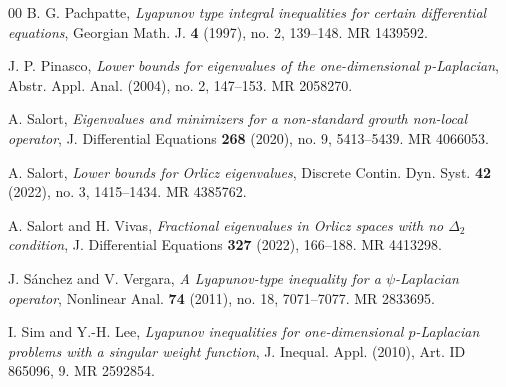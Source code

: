 \documentclass[12pt,reqno]{amsart}
\theoremstyle{definition}
\theoremstyle{remark}
\numberwithin{equation}{section}
\begin{document}
\begin{thebibliography}{00}
B. G. Pachpatte, \emph{Lyapunov type integral inequalities for certain differential equations}, Georgian Math. J. \textbf{4} (1997), no. 2, 139--148. MR 1439592.

J. P. Pinasco, \emph{Lower bounds for eigenvalues of the one-dimensional $p$-Laplacian}, Abstr. Appl. Anal. (2004), no. 2, 147--153. MR 2058270.

A. Salort, \emph{Eigenvalues and minimizers for a non-standard growth non-local operator}, J. Differential Equations \textbf{268} (2020), no. 9, 5413--5439. MR 4066053.

A. Salort, \emph{Lower bounds for Orlicz eigenvalues}, Discrete Contin. Dyn. Syst. \textbf{42} (2022), no. 3, 1415--1434. MR 4385762.

A. Salort and H. Vivas, \emph{Fractional eigenvalues in Orlicz spaces with no $\Delta_2$ condition}, J. Differential Equations \textbf{327} (2022), 166--188. MR 4413298.

J. S\'{a}nchez and V. Vergara, \emph{A Lyapunov-type inequality for a $\psi$-Laplacian operator}, Nonlinear Anal. \textbf{74} (2011), no. 18, 7071--7077. MR 2833695.

I. Sim and Y.-H. Lee, \emph{Lyapunov inequalities for one-dimensional $p$-Laplacian problems with a singular weight function}, J. Inequal. Appl. (2010), Art. ID 865096, 9. MR 2592854.

\end{thebibliography}

 
% 
% 
 
\end{document}
